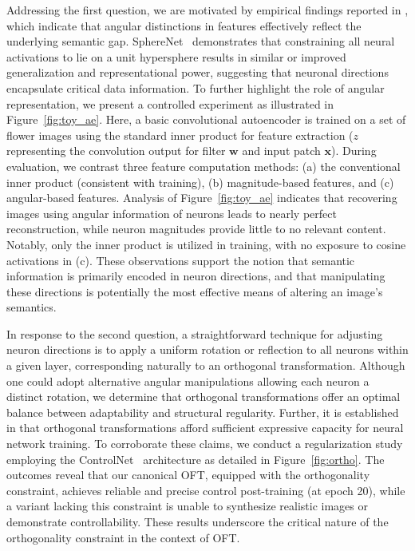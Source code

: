 Addressing the first question, we are motivated by empirical findings reported in \cite{liu2018decoupled,chen2020angular}, which indicate that angular distinctions in features effectively reflect the underlying semantic gap. SphereNet~\cite{liu2017deep} demonstrates that constraining all neural activations to lie on a unit hypersphere results in similar or improved generalization and representational power, suggesting that neuronal directions encapsulate critical data information. To further highlight the role of angular representation, we present a controlled experiment as illustrated in Figure~\ref{fig:toy_ae}. Here, a basic convolutional autoencoder is trained on a set of flower images using the standard inner product for feature extraction ($z$ representing the convolution output for filter $\bm{w}$ and input patch $\bm{x}$). During evaluation, we contrast three feature computation methods: (a) the conventional inner product (consistent with training), (b) magnitude-based features, and (c) angular-based features. Analysis of Figure~\ref{fig:toy_ae} indicates that recovering images using angular information of neurons leads to nearly perfect reconstruction, while neuron magnitudes provide little to no relevant content. Notably, only the inner product is utilized in training, with no exposure to cosine activations in (c). These observations support the notion that semantic information is primarily encoded in neuron directions, and that manipulating these directions is potentially the most effective means of altering an image’s semantics.

In response to the second question, a straightforward technique for adjusting neuron directions is to apply a uniform rotation or reflection to all neurons within a given layer, corresponding naturally to an orthogonal transformation. Although one could adopt alternative angular manipulations allowing each neuron a distinct rotation, we determine that orthogonal transformations offer an optimal balance between adaptability and structural regularity. Further, it is established in \cite{liu2021orthogonal} that orthogonal transformations afford sufficient expressive capacity for neural network training. To corroborate these claims, we conduct a regularization study employing the ControlNet~\cite{zhang2023adding} architecture as detailed in Figure~\ref{fig:ortho}. The outcomes reveal that our canonical OFT, equipped with the orthogonality constraint, achieves reliable and precise control post-training (at epoch 20), while a variant lacking this constraint is unable to synthesize realistic images or demonstrate controllability. These results underscore the critical nature of the orthogonality constraint in the context of OFT.

